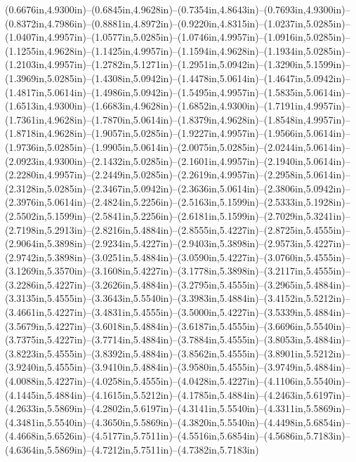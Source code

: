 (0.6676in,4.9300in)--(0.6845in,4.9628in)--(0.7354in,4.8643in)--(0.7693in,4.9300in)--(0.8372in,4.7986in)--(0.8881in,4.8972in)--(0.9220in,4.8315in)--(1.0237in,5.0285in)--(1.0407in,4.9957in)--(1.0577in,5.0285in)--(1.0746in,4.9957in)--(1.0916in,5.0285in)--(1.1255in,4.9628in)--(1.1425in,4.9957in)--(1.1594in,4.9628in)--(1.1934in,5.0285in)--(1.2103in,4.9957in)--(1.2782in,5.1271in)--(1.2951in,5.0942in)--(1.3290in,5.1599in)--(1.3969in,5.0285in)--(1.4308in,5.0942in)--(1.4478in,5.0614in)--(1.4647in,5.0942in)--(1.4817in,5.0614in)--(1.4986in,5.0942in)--(1.5495in,4.9957in)--(1.5835in,5.0614in)--(1.6513in,4.9300in)--(1.6683in,4.9628in)--(1.6852in,4.9300in)--(1.7191in,4.9957in)--(1.7361in,4.9628in)--(1.7870in,5.0614in)--(1.8379in,4.9628in)--(1.8548in,4.9957in)--(1.8718in,4.9628in)--(1.9057in,5.0285in)--(1.9227in,4.9957in)--(1.9566in,5.0614in)--(1.9736in,5.0285in)--(1.9905in,5.0614in)--(2.0075in,5.0285in)--(2.0244in,5.0614in)--(2.0923in,4.9300in)--(2.1432in,5.0285in)--(2.1601in,4.9957in)--(2.1940in,5.0614in)--(2.2280in,4.9957in)--(2.2449in,5.0285in)--(2.2619in,4.9957in)--(2.2958in,5.0614in)--(2.3128in,5.0285in)--(2.3467in,5.0942in)--(2.3636in,5.0614in)--(2.3806in,5.0942in)--(2.3976in,5.0614in)--(2.4824in,5.2256in)--(2.5163in,5.1599in)--(2.5333in,5.1928in)--(2.5502in,5.1599in)--(2.5841in,5.2256in)--(2.6181in,5.1599in)--(2.7029in,5.3241in)--(2.7198in,5.2913in)--(2.8216in,5.4884in)--(2.8555in,5.4227in)--(2.8725in,5.4555in)--(2.9064in,5.3898in)--(2.9234in,5.4227in)--(2.9403in,5.3898in)--(2.9573in,5.4227in)--(2.9742in,5.3898in)--(3.0251in,5.4884in)--(3.0590in,5.4227in)--(3.0760in,5.4555in)--(3.1269in,5.3570in)--(3.1608in,5.4227in)--(3.1778in,5.3898in)--(3.2117in,5.4555in)--(3.2286in,5.4227in)--(3.2626in,5.4884in)--(3.2795in,5.4555in)--(3.2965in,5.4884in)--(3.3135in,5.4555in)--(3.3643in,5.5540in)--(3.3983in,5.4884in)--(3.4152in,5.5212in)--(3.4661in,5.4227in)--(3.4831in,5.4555in)--(3.5000in,5.4227in)--(3.5339in,5.4884in)--(3.5679in,5.4227in)--(3.6018in,5.4884in)--(3.6187in,5.4555in)--(3.6696in,5.5540in)--(3.7375in,5.4227in)--(3.7714in,5.4884in)--(3.7884in,5.4555in)--(3.8053in,5.4884in)--(3.8223in,5.4555in)--(3.8392in,5.4884in)--(3.8562in,5.4555in)--(3.8901in,5.5212in)--(3.9240in,5.4555in)--(3.9410in,5.4884in)--(3.9580in,5.4555in)--(3.9749in,5.4884in)--(4.0088in,5.4227in)--(4.0258in,5.4555in)--(4.0428in,5.4227in)--(4.1106in,5.5540in)--(4.1445in,5.4884in)--(4.1615in,5.5212in)--(4.1785in,5.4884in)--(4.2463in,5.6197in)--(4.2633in,5.5869in)--(4.2802in,5.6197in)--(4.3141in,5.5540in)--(4.3311in,5.5869in)--(4.3481in,5.5540in)--(4.3650in,5.5869in)--(4.3820in,5.5540in)--(4.4498in,5.6854in)--(4.4668in,5.6526in)--(4.5177in,5.7511in)--(4.5516in,5.6854in)--(4.5686in,5.7183in)--(4.6364in,5.5869in)--(4.7212in,5.7511in)--(4.7382in,5.7183in)
